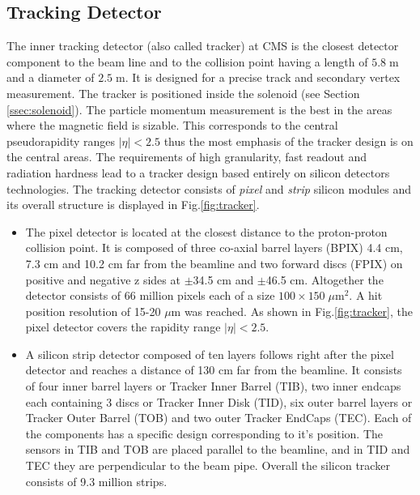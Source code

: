 \subsection{Tracking Detector}\label{sec:tracker}

The inner tracking detector\cite{TrackerTDR, CMSatLHC} (also called tracker) at CMS is the closest detector component to the beam line and to the collision point having a
length of $5.8\;$m and a diameter of $2.5\;$m. It is designed for a precise track and secondary vertex measurement. 
The tracker is positioned inside the solenoid (see Section \ref{ssec:solenoid}). The particle momentum measurement is the best in the areas where the magnetic field
is sizable. This corresponds to the central pseudorapidity ranges $|\eta| < 2.5$ thus the most emphasis of the tracker design is on the central
areas. The requirements of high granularity, fast readout and radiation hardness lead to a tracker design based entirely on silicon
detectors technologies. The tracking detector consists of \textit{pixel} and \textit{strip} silicon modules
and its overall structure is displayed in Fig.\ref{fig:tracker}.

\begin{itemize}
 \item The pixel detector is located at the closest distance to the proton-proton collision point. It is composed of three co-axial barrel layers (BPIX)
 4.4 cm, 7.3 cm and 10.2 cm far from the beamline and two forward discs (FPIX) on positive and negative z sides
 at $\pm$34.5 cm and $\pm$46.5 cm. Altogether the detector consists of 66 million pixels each of a size $100 \times 150\;\mu$m$^2$. A hit
 position resolution of 15-20 $\mu$m was reached\cite{TrackPerf}.
 As shown in Fig.\ref{fig:tracker}, the pixel detector covers the rapidity range $|\eta| < 2.5$.
 
 \item A silicon strip detector composed of ten layers follows right after the pixel detector and reaches a distance of 130 cm far
 from the beamline. It consists of four inner barrel layers or Tracker Inner Barrel (TIB), two inner endcaps each containing 3 discs
 or Tracker Inner Disk (TID), six outer barrel layers or Tracker Outer Barrel (TOB) and two outer Tracker EndCaps (TEC).
 Each of the components has a specific design corresponding to it's position. The sensors in TIB and TOB are placed parallel to the
 beamline, and in TID and TEC they are perpendicular to the beam pipe. Overall the silicon tracker consists of 9.3
 million strips.
\end{itemize}

